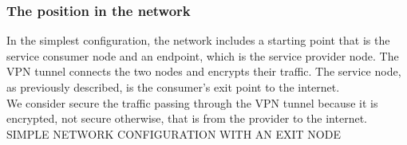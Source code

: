 \documentclass[12pt]{article}
\begin{document}
	\subsubsection{The position in the network}

	In the simplest configuration, the network includes a starting point that is the service consumer node and an endpoint, which is the service provider node. The VPN tunnel connects the two nodes and encrypts their traffic. The service node, as previously described, is the consumer's exit point to the internet.\\
	We consider secure the traffic passing through the VPN tunnel because it is encrypted, not secure otherwise, that is from the provider to the internet.\\

	SIMPLE NETWORK CONFIGURATION WITH AN EXIT NODE\\
\end{document}
